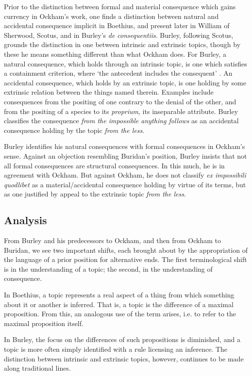 \documentclass[]{article}
\begin{document}
		Prior to the distinction between formal and material consequence which gains currency in Ockham's work, one finds a distinction between natural and accidental consequence implicit in Boethius, and present later in William of Sherwood, Scotus, and in Burley's \textit{de consequentiis}. Burley, following Scotus, grounds the distinction in one between intrinsic and extrinsic topics, though by these he means something different than what Ockham does. For Burley, a natural consequence, which holds through an intrinsic topic, is one which satisfies a containment criterion, where `the antecedent includes the consequent' \cite[p. 61.6-10]{BurleyDPAL}. An accidental consequence, which holds by an extrinsic topic, is one holding by some extrinsic relation between the things named therein. Examples include consequences from the positing of one contrary to the denial of the other, and from the positing of a species to its \textit{proprium}, its inseparable attribute. Burley classifies the consequence \textit{from the impossible anything follows} as an accidental consequence holding by the topic \textit{from the less}. 
		
		Burley identifies his natural consequences with formal consequences in Ockham's sense. Against an objection resembling Buridan's position, Burley insists that not all formal consequences are structural consequences. In this much, he is in agreement with Ockham. But against Ockham, he does not classify \textit{ex impossibili quodlibet} as a material/accidental consequence holding by virtue of its terms, but as one justified by appeal to the extrinsic topic \textit{from the less}.
		\subsection{Analysis}
		From Burley and his predecessors to Ockham, and then from Ockham to Buridan, we see two important shifts, each brought about by the appropriation of the language of a prior position for alternative ends. The first terminological shift is in the understanding of a topic; the second, in the understanding of consequence.
		
		In Boethius, a topic represents a real aspect of a thing from which something about it or another is inferred. That is, a topic is the difference of a maximal proposition. From this, an analogous use of the term arises, i.e. to refer to the maximal proposition itself.
		
		In Burley, the focus on the differences of such propositions is diminished, and a topic is more often simply identified with a rule licensing an inference. The distinction between intrinsic and extrinsic topics, however, continues to be made along  traditional lines.
		
\end{document}
